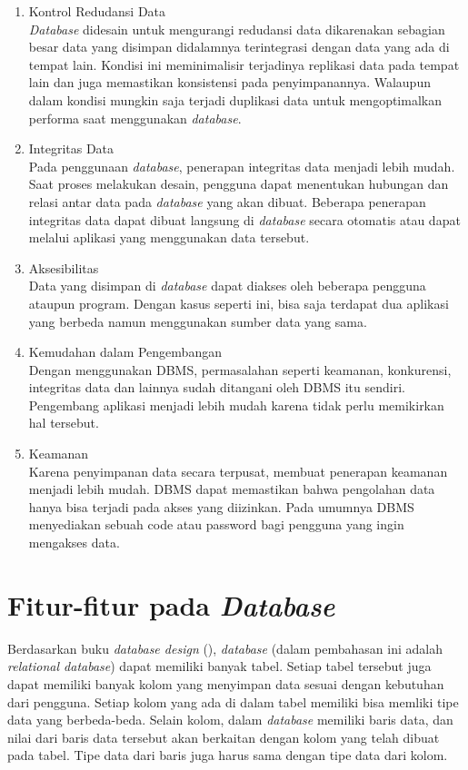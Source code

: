 \begin{enumerate}
	\item Kontrol Redudansi Data \\
	\emph{Database} didesain untuk mengurangi redudansi data dikarenakan 
  sebagian besar data yang disimpan didalamnya terintegrasi 
  dengan data yang ada di tempat lain. Kondisi ini meminimalisir 
  terjadinya replikasi data pada tempat lain dan juga memastikan 
  konsistensi pada penyimpanannya. Walaupun dalam kondisi mungkin 
  saja  terjadi duplikasi data untuk mengoptimalkan performa saat 
  menggunakan \emph{database}.

	\item Integritas Data \\
  Pada penggunaan \emph{database}, penerapan integritas data menjadi 
  lebih mudah. Saat proses melakukan desain, pengguna dapat 
  menentukan hubungan dan relasi antar data pada \emph{database} yang 
  akan dibuat. Beberapa penerapan integritas data dapat dibuat 
  langsung di \emph{database} secara otomatis atau dapat melalui 
  aplikasi yang menggunakan data tersebut.

	\item Aksesibilitas \\
	Data yang disimpan di \emph{database} dapat diakses oleh beberapa 
  pengguna ataupun program. Dengan kasus seperti ini, bisa 
  saja terdapat dua aplikasi yang berbeda namun menggunakan 
  sumber data yang sama.

  \item Kemudahan dalam Pengembangan \\
  Dengan menggunakan DBMS, permasalahan seperti keamanan, 
  konkurensi, integritas data dan lainnya sudah ditangani 
  oleh DBMS itu sendiri. Pengembang aplikasi menjadi lebih 
  mudah karena tidak perlu memikirkan hal tersebut.

  
  \item Keamanan \\
  Karena penyimpanan data secara terpusat, membuat penerapan 
  keamanan menjadi lebih mudah. DBMS dapat memastikan bahwa 
  pengolahan data hanya bisa terjadi pada akses yang 
  diizinkan. Pada umumnya DBMS menyediakan sebuah code atau 
  password bagi pengguna yang ingin mengakses data.
\end{enumerate}


\section{Fitur-fitur pada \emph{Database}}
Berdasarkan buku \emph{database design} (\cite{databasedesignwatt}), \emph{database} (dalam pembahasan ini adalah \emph{relational database}) dapat memiliki banyak tabel. 
Setiap tabel tersebut juga dapat memiliki banyak kolom yang menyimpan data sesuai dengan kebutuhan dari pengguna. Setiap kolom yang ada di dalam tabel memiliki bisa memliki tipe data yang
berbeda-beda. Selain kolom, dalam \emph{database} memiliki baris data, dan nilai dari baris data tersebut akan berkaitan dengan kolom yang telah dibuat pada tabel. Tipe data dari baris juga harus
sama dengan tipe data dari kolom. 

